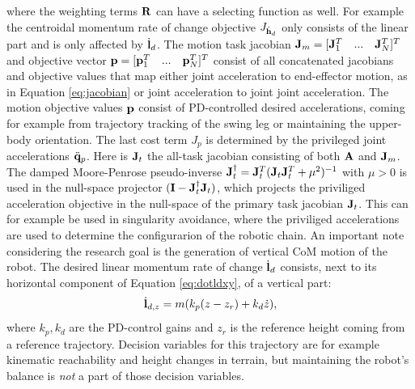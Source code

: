where the weighting terms $\mathbf{R}$ can have a selecting function as well. For example the centroidal momentum rate of change objective $J_{\dot{\mathbf{h}}_d}$ only consists of the linear part and is only affected by $\dot{\mathbf{l}}_d$. The motion task jacobian $\mathbf{J}_m = [\mathbf{J}_1^T\quad...\quad\mathbf{J}_N^T]^T$ and objective vector $\mathbf{p} = [\mathbf{p}_1^T\quad...\quad\mathbf{p}_N^T]^T$ consist of all concatenated jacobians and objective values that map either joint acceleration to end-effector motion, as in Equation \eqref{eq:jacobian} or joint acceleration to joint joint acceleration. The motion objective values $\mathbf{p}$ consist of PD-controlled desired accelerations, coming for example from trajectory tracking of the swing leg or maintaining the upper-body orientation. The last cost term $J_p$ is determined by the privileged joint accelerations $\ddot{\mathbf{q}}_p$. Here is $\mathbf{J}_t$ the all-task jacobian consisting of both $\mathbf{A}$ and $\mathbf{J}_m$. The damped Moore-Penrose pseudo-inverse  $\mathbf{J}_t^{\dagger} = \mathbf{J}_t^T(\mathbf{J}_t\mathbf{J}_t^T +\mu^2)^{-1}$ with $\mu>0$ is used in the null-space projector $(\mathbf{I} - \mathbf{J}_t^{\dagger}\mathbf{J}_t)$, which projects the priviliged acceleration objective in the null-space of the primary task jacobian $\mathbf{J}_t$. This can for example be used in singularity avoidance, where the priviliged accelerations are used to determine the configurarion of the robotic chain.  
\paraskip
An important note considering the research goal is the generation of vertical \ac{CoM} motion of the robot. The desired linear momentum rate of change $\dot{\mathbf{l}}_d$ consists, next to its horizontal component of Equation \eqref{eq:dotldxy}, of a vertical part:
\begin{equation}
\dot{\mathbf{l}}_{d,z} =m(k_p(z-z_r) + k_d\dot{z}), 
\end{equation}
where $k_p, k_d$ are the PD-control gains and $z_r$ is the reference height coming from a reference trajectory. Decision variables for this trajectory are for example kinematic reachability and height changes in terrain, but maintaining the robot's balance is \textit{not } a part of those decision variables.


